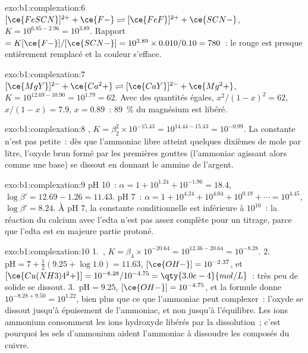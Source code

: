 \begin{solution}{exo:b1:complexation:6}
$[\ce{FeSCN}]^{2+} + \ce{F-} \rightleftharpoons [\ce{FeF}]^{2+} + \ce{SCN-}$,
$K = 10^{6.85 - 2.96} = 10^{3.89}$. Rapport $= K[\ce{F-}]/[\ce{SCN-}] =
10^{3.89} \times 0.010/0.10 = 780$~: le  rouge est presque
entièrement remplacé et la couleur s'efface.
\end{solution}

\begin{solution}{exo:b1:complexation:7}
$[\ce{MgY}]^{2-} + \ce{Ca^2+} \rightleftharpoons [\ce{CaY}]^{2-} + \ce{Mg^2+}$,
$K = 10^{12.69 - 10.90} = 10^{1.79} = 62$. Avec des quantités égales,
$x^2/(1 - x)^2 = 62$, $x/(1 - x) = 7.9$, $x = 0.89$~: \qty{89}{\percent}
du magnésium est libéré.
\end{solution}

\begin{solution}{exo:b1:complexation:8}
, $K = \beta_2^2 \times
10^{-15.43} = 10^{14.44 - 15.43} = 10^{-0.99}$. La constante n'est pas
petite~: dès que l'ammoniac libre atteint quelques dixièmes de mole par
litre, l'oxyde brun formé par les premières gouttes (l'ammoniac agissant
alors comme une base) se dissout en donnant le  ammine de
l'argent.
\end{solution}

\begin{solution}{exo:b1:complexation:9}
pH 10~: $\alpha = 1 + 10^{1.24} + 10^{-1.96} = 18.4$, $\log\beta' = 12.69 -
1.26 = 11.43$. pH 7~: $\alpha = 1 + 10^{4.24} + 10^{4.04} + 10^{0.19} +
\cdots = 10^{4.45}$, $\log\beta' = 8.24$. À pH 7, la constante
conditionnelle est inférieure à $10^{10}$~: la réaction du calcium avec
l'edta n'est pas assez complète pour un titrage, parce que l'edta est en
majeure partie protoné.
\end{solution}

\begin{solution}{exo:b1:complexation:10}
1.~, $K = \beta_4 \times
10^{-20.64} = 10^{12.36 - 20.64} = 10^{-8.28}$.
2.~$\mathrm{pH} = 7 + \frac12(9.25 + \log 1.0) = 11.63$, $[\ce{OH-}] =
10^{-2.37}$, et $[\ce{Cu(NH3)4^2+}] = 10^{-8.28}/10^{-4.75} =
\qty{3.0e-4}{mol/L}$~: très peu de solide se dissout.
3.~$\mathrm{pH} = 9.25$, $[\ce{OH-}] = 10^{-4.75}$, et la formule donne
$10^{-8.28 + 9.50} = 10^{1.22}$, bien plus que ce que l'ammoniac peut
complexer~: l'oxyde se dissout jusqu'à épuisement de l'ammoniac, et non
jusqu'à l'équilibre. Les ions ammonium consomment les ions hydroxyde
libérés par la dissolution~; c'est pourquoi les sels d'ammonium aident
l'ammoniac à dissoudre les composés du cuivre.
\end{solution}

